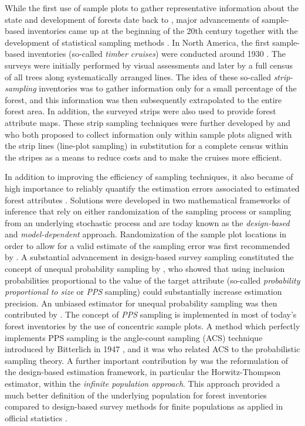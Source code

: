 While the first use of sample plots to gather representative information about the state and development of forests date back to \citet{hartig1795}, major advancements of sample-based inventories came up at the beginning of the 20th century together with the development of statistical sampling methods \citep{schreuder1993}. In North America, the first sample-based inventories (so-called \textit{timber cruises}) were conducted around 1930 \citep{kangas2006}. The surveys were initially performed by visual assessments and later by a full census of all trees along systematically arranged lines. The idea of these so-called \textit{strip-sampling} inventories was to gather information only for a small percentage of the forest, and this information was then subsequently extrapolated to the entire forest area. In addition, the surveyed strips were also used to provide forest attribute maps. These strip sampling techniques were further developed by \citet{goodspeed1934} and \citet{langballe1938} who both proposed to collect information only within sample plots aligned with the strip lines (line-plot sampling) in substitution for a complete census within the stripes as a means to reduce costs and to make the cruises more efficient.\par 

In addition to improving the efficiency of sampling techniques, it also became of high importance to reliably quantify the estimation errors associated to estimated forest attributes \citep{kangas2006}. Solutions were developed in two mathematical frameworks of inference that rely on either randomization of the sampling process or sampling from an underlying stochastic process and are today known as the \textit{design-based} and \textit{model-dependent} approach. Randomization of the sample plot locations in order to allow for a valid estimate of the sampling error was first recommended by \citet{hasel1938}. A substantial advancement in design-based survey sampling constituted the concept of unequal probability sampling by \citet{hansen1943}, who showed that using inclusion probabilities proportional to the value of the target attribute (so-called \textit{probability proportional to size} or \textit{PPS} sampling) could substantially increase estimation precision. An unbiased estimator for unequal probability sampling was then contributed by \citet{horvitz1952}. The concept of \textit{PPS} sampling is implemented in most of today's forest inventories by the use of concentric sample plots. A method which perfectly implements PPS sampling is the angle-count sampling (ACS) technique introduced by Bitterlich in 1947 \citep{bitterlich1984}, and it was \citet{grosenbaugh1958} who related ACS to the probabilistic sampling theory. A further important contribution by \citet{mandallaz1991} was the reformulation of the design-based estimation framework, in particular the Horwitz-Thompson estimator, within the \textit{infinite population approach}. This approach provided a much better definition of the underlying population for forest inventories compared to design-based survey methods for finite populations as applied in official statistics \citep[e.g.,][]{sarndal2003}.\par

